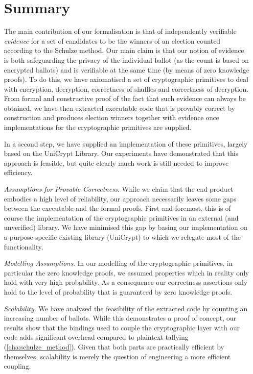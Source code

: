 \section{Summary}

\noindent The main contribution of our formalisation is that of independently
verifiable \emph{evidence} for a set of candidates to be the winners
of an election counted according to the Schulze method. Our main
claim is that our notion of evidence is both safeguarding the
privacy of the individual ballot (as the count is based on encrypted
ballots) and is verifiable at the same time (by means of zero
knowledge proofs). To do this, we have axiomatised a set of
cryptographic primitives to deal with encryption, decryption,
correctness of shuffles and correctness of decryption. From formal
and constructive proof of the fact that such evidence can always be
obtained, we have then extracted executable code that is provably
correct by construction and produces election winners together with
evidence once implementations for the cryptographic primitives are
supplied.

In a second step, we have supplied an implementation of these
primitives, largely based on the UniCrypt Library. Our experiments
have demonstrated that this approach is feasible, but quite clearly
much work is still needed to improve efficiency. 

\smallskip\noindent\emph{Assumptions for Provable Correctness.}
While we claim that the end product embodies a high level of
reliability, our approach necessarily leaves some gaps between the
executable and the formal proofs. First and foremost, this is of
course the implementation of the cryptographic primitives in an
external (and unverified) library. We have minimised this gap by
basing our implementation on a purpose-specific existing library
(UniCrypt) to which we relegate most of the functionality. 


\smallskip\noindent\emph{Modelling Assumptions.} In our modelling of
the cryptographic primitives, in particular the zero knowledge
proofs, we assumed properties which in reality only hold with
very high probability. As a
consequence our correctness assertions only hold to the level
of probability that is guaranteed by zero knowledge proofs.

\smallskip\noindent\emph{Scalability.} We have analysed the
feasibility of the extracted code by counting an increasing number
of ballots. While this demonstrates a proof of concept, our results
show that the bindings used to couple the cryptographic layer with
our code adds significant overhead compared
to plaintext tallying (\ref{cha:schulze_method}). Given that both
parts are practically efficient by themselves, scalability is merely
the question of engineering a more efficient coupling. 


